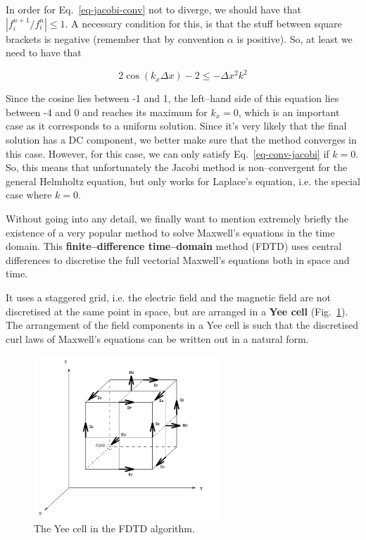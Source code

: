  In order for Eq.~\ref{eq-jacobi-conv} not to diverge, we should have that $\left|f_i^{n+1} / f_i^{n}\right| \le 1$. A necessary condition for this, is that the stuff between square brackets is negative (remember that by convention $\alpha$ is positive). So, at least we need to have that

\begin{equation}
2 \cos ( k_x  \Delta x) - 2 \le - \Delta x^2 k^2 \label{eq-conv-jacobi}
\end{equation} 

Since the cosine lies between -1 and 1, the left--hand side of this equation lies between -4 and 0 and reaches its maximum for $k_x=0$, which is an important case as it corresponds to a uniform solution. Since it's very likely that the final solution has a DC component, we better make sure that the method converges in this case. However, for this case, we can only satisfy Eq.~\ref{eq-conv-jacobi} if $k=0$. So, this means that unfortunately the Jacobi method is non--convergent for the general Helmholtz equation, but only works for Laplace's equation, i.e. the special case where $k=0$.

\pagebreak

\label{week6}

Without going into any detail, we finally want to mention extremely briefly the existence of a very popular method to solve Maxwell's equations in the time domain. This \textbf{finite--difference time--domain} method (FDTD) uses central differences to discretise the full vectorial Maxwell's equations both in space and time.

It uses a staggered grid, i.e. the electric field and the magnetic field are not discretised at the same point in space, but are arranged in a \textbf{Yee cell} (Fig.~\ref{fig-yee}). The arrangement of the field components in a Yee cell is such that the discretised curl laws of Maxwell's equations can be written out in a natural form.

\begin{figure}
\centering
\includegraphics[width=7cm]{numeric/figures/yeecell}
\caption{The Yee cell in the FDTD algorithm.}
\label{fig-yee}
\end{figure}

